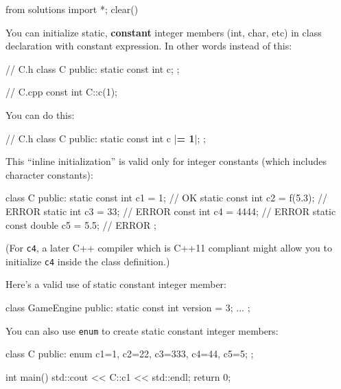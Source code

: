 \begin{python0}
from solutions import *; clear()
\end{python0}

You can initialize static, \textbf{constant} integer members (int, char,
etc) in class declaration with constant expression. In other words
instead of this:

\begin{consolethree}[escapeinside=||]
// C.h
class C
{
public:
    static const int c;
};
\end{consolethree}

\begin{consolethree}[escapeinside=||]
// C.cpp
const int C::c(1);
\end{consolethree}

You can do this:

\begin{consolethree}[escapeinside=||]
// C.h
class C
{
public:
    static const int c |{\bf = 1}|;
};
\end{consolethree}

This ``inline initialization'' is valid only for integer constants
(which includes character constants):

\begin{consolethree}[escapeinside=||]
class C
{
public:
    static const int c1 = 1;        // OK
    static const int c2 = f(5.3);   // ERROR
    static int c3 = 33;             // ERROR
    const int c4 = 4444;            // ERROR
    static const double c5 = 5.5;   // ERROR
};
\end{consolethree}

(For \texttt{c4}, a later C++ compiler which is C++11 compliant might
allow you to initialize \texttt{c4} inside the class definition.)

Here's a valid use of static constant integer member:

\begin{consolethree}[escapeinside=||]
class GameEngine
{
public:
    static const int version = 3;
    ...
};
\end{consolethree}

You can also use \texttt{enum} to create static constant integer members:

\begin{consolethree}[escapeinside=||]
class C
{
public:
    enum {c1=1, c2=22, c3=333, c4=44, c5=5};
};

int main()
{
    std::cout << C::c1 << std::endl;
    return 0;
}
\end{consolethree}



